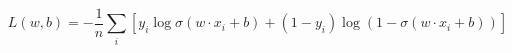 
\begin{equation}\label{eq:nll}
L(w, b) = - \frac{1}{n} \sum_i \left[ y_i \log \sigma(w \cdot x_i + b) + (1 - y_i) \log (1 - \sigma(w \cdot x_i + b)) \right]
\end{equation}
